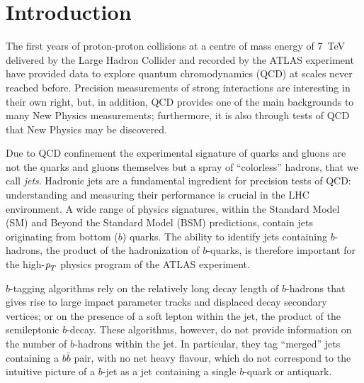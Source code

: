 
\chapter{Introduction}

The first years of proton-proton collisions at a centre of mass energy of 7~TeV delivered by the Large Hadron Collider and recorded by the ATLAS experiment have provided data to
explore quantum chromodynamics (QCD) at scales never reached before. Precision measurements of strong interactions are interesting in their own right, but, in addition, QCD provides one of the main
backgrounds to many New Physics measurements; furthermore, it is also through tests of QCD
that New Physics may be discovered.

Due to QCD confinement the experimental signature of quarks and gluons are not the quarks and gluons themselves but a spray of ``colorless'' hadrons, that we call \emph{jets}.  Hadronic jets are a fundamental ingredient for precision tests of QCD: understanding and measuring their performance is crucial in the LHC environment. A wide range of physics signatures, within the Standard Model (SM) and Beyond the Standard Model (BSM) predictions, contain jets originating from bottom ($b$) quarks. 
The ability to identify jets containing $b$-hadrons, the product of the hadronization of $b$-quarks, is therefore important for the high-${\emph{p}_{T}}$ physics program of the ATLAS experiment. 

$b$-tagging algorithms rely on the relatively long decay length of $b$-hadrons that gives rise to large impact parameter tracks and displaced decay secondary vertices; or on the presence of a soft lepton within the jet, the product of the semileptonic $b$-decay.   
These algorithms, however, do not provide information on the number of $b$-hadrons within the jet. In particular, they tag  ``merged'' jets containing a $b\bar{b}$ pair, with no net heavy flavour, which do not correspond to the intuitive picture of a $b$-jet as a jet containing a single $b$-quark or antiquark.

